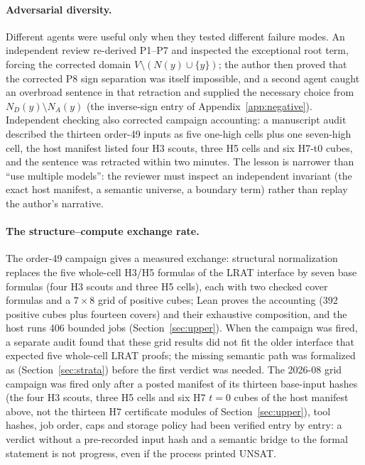\documentclass{anvil-paper}
\theoremstyle{definition}
\begin{document}
\paragraph{Adversarial diversity.} Different agents were useful only when they tested different failure modes. An independent review re-derived P1--P7 and inspected the exceptional root term, forcing the corrected domain $V\setminus(N(y)\cup\{y\})$; the author then proved that the corrected P8 sign separation was itself impossible, and a second agent caught an overbroad sentence in that retraction and supplied the necessary choice from $N_D(y)\setminus N_A(y)$ (the inverse-sign entry of Appendix~\ref{app:negative}). Independent checking also corrected campaign accounting: a manuscript audit described the thirteen order-49 inputs as five one-high cells plus one seven-high cell, the host manifest listed four H3 scouts, three H5 cells and six H7-t0 cubes, and the sentence was retracted within two minutes. The lesson is narrower than ``use multiple models'': the reviewer must inspect an independent invariant (the exact host manifest, a semantic universe, a boundary term) rather than replay the author's narrative.

\paragraph{The structure--compute exchange rate.} The order-49 campaign gives a measured exchange: structural normalization replaces the five whole-cell H3/H5 formulas of the LRAT interface by seven base formulas (four H3 scouts and three H5 cells), each with two checked cover formulas and a $7\times 8$ grid of positive cubes; Lean proves the accounting (392 positive cubes plus fourteen covers) and their exhaustive composition, and the host runs 406 bounded jobs (Section~\ref{sec:upper}). When the campaign was fired, a separate audit found that these grid results did not fit the older interface that expected five whole-cell LRAT proofs; the missing semantic path was formalized as  (Section~\ref{sec:strata}) before the first verdict was needed. The 2026-08 grid campaign was fired only after a posted manifest of its thirteen base-input hashes (the four H3 scouts, three H5 cells and six H7 $t=0$ cubes of the host manifest above, not the thirteen H7 certificate modules of Section~\ref{sec:upper}), tool hashes, job order, caps and storage policy had been verified entry by entry: a verdict without a pre-recorded input hash and a semantic bridge to the formal statement is not progress, even if the process printed UNSAT.
\end{document}
